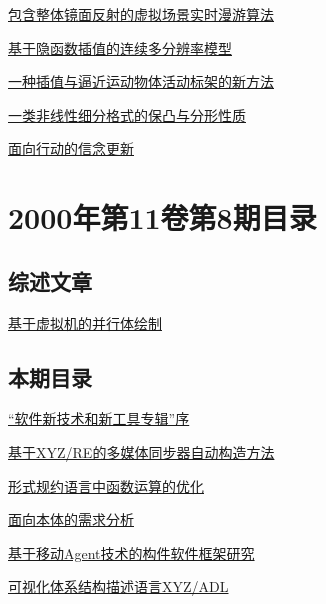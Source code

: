 \documentclass[a4paper]{article}
\begin{document}
\href{http://www.jos.org.cn/ch/reader/download_pdf.aspx?file_no=20000917&year_id=2000&quarter_id=9&falg=1}{包含整体镜面反射的虚拟场景实时漫游算法}

\href{http://www.jos.org.cn/ch/reader/download_pdf.aspx?file_no=20000918&year_id=2000&quarter_id=9&falg=1}{基于隐函数插值的连续多分辨率模型}

\href{http://www.jos.org.cn/ch/reader/download_pdf.aspx?file_no=20000919&year_id=2000&quarter_id=9&falg=1}{一种插值与逼近运动物体活动标架的新方法}

\href{http://www.jos.org.cn/ch/reader/download_pdf.aspx?file_no=20000920&year_id=2000&quarter_id=9&falg=1}{一类非线性细分格式的保凸与分形性质}

\href{http://www.jos.org.cn/ch/reader/download_pdf.aspx?file_no=20000922&year_id=2000&quarter_id=9&falg=1}{面向行动的信念更新}


\section{\textbf{2000年第11卷第8期目录}}
\subsection{综述文章}
\href{http://www.jos.org.cn/ch/reader/download_pdf.aspx?file_no=20000816&year_id=2000&quarter_id=8&falg=1}{基于虚拟机的并行体绘制}

\subsection{本期目录}
\href{http://www.jos.org.cn/ch/reader/download_pdf.aspx?file_no=20000801&year_id=2000&quarter_id=8&falg=1}{“软件新技术和新工具专辑”序}

\href{http://www.jos.org.cn/ch/reader/download_pdf.aspx?file_no=20000802&year_id=2000&quarter_id=8&falg=1}{基于XYZ/RE的多媒体同步器自动构造方法}

\href{http://www.jos.org.cn/ch/reader/download_pdf.aspx?file_no=20000803&year_id=2000&quarter_id=8&falg=1}{形式规约语言中函数运算的优化}

\href{http://www.jos.org.cn/ch/reader/download_pdf.aspx?file_no=20000804&year_id=2000&quarter_id=8&falg=1}{面向本体的需求分析}

\href{http://www.jos.org.cn/ch/reader/download_pdf.aspx?file_no=20000805&year_id=2000&quarter_id=8&falg=1}{基于移动Agent技术的构件软件框架研究}

\href{http://www.jos.org.cn/ch/reader/download_pdf.aspx?file_no=20000806&year_id=2000&quarter_id=8&falg=1}{可视化体系结构描述语言XYZ/ADL}
\end{document}
